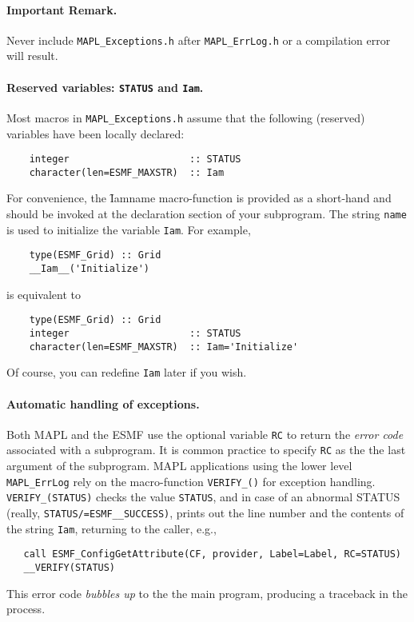 \paragraph{Important Remark.} Never include {\tt MAPL\_Exceptions.h}
after {\tt MAPL\_ErrLog.h} or a compilation error will result. 

\paragraph{Reserved variables: {\tt STATUS} and {\tt Iam}.} Most
macros in {\tt MAPL\_Exceptions.h} assume that the following
(reserved) variables have been locally declared:
\begin{verbatim}
    integer                     :: STATUS
    character(len=ESMF_MAXSTR)  :: Iam
\end{verbatim}
For convenience, the \f{Iam}{name} macro-function is provided as a
short-hand and should be invoked at the declaration section of your
subprogram. The string {\tt name} is used to initialize the variable
{\tt Iam}. For example,
\begin{verbatim}
    type(ESMF_Grid) :: Grid
    __Iam__('Initialize')
\end{verbatim}
is equivalent to
\begin{verbatim}
    type(ESMF_Grid) :: Grid
    integer                     :: STATUS
    character(len=ESMF_MAXSTR)  :: Iam='Initialize'
\end{verbatim}
Of course, you can redefine {\tt Iam} later if you wish.

\paragraph{Automatic handling of exceptions.}

Both MAPL and the ESMF use the optional variable {\tt RC} to return
the {\em error code} associated with a subprogram. It is common
practice to specify {\tt RC} as the the last argument of the subprogram. MAPL
applications using the lower level {\tt MAPL\_ErrLog} rely on the
macro-function {\tt VERIFY\_()} for exception handling. {\tt
  VERIFY\_(STATUS)} checks the value {\tt STATUS}, and in case of an
abnormal STATUS (really, {\tt STATUS/=ESMF\__SUCCESS)}, prints out the line
number and the contents of the string {\tt Iam}, returning to the caller, e.g.,
\begin{verbatim}
   call ESMF_ConfigGetAttribute(CF, provider, Label=Label, RC=STATUS)
   __VERIFY(STATUS)
\end{verbatim}
This error code {\em bubbles up} to the the main program, producing a
traceback in the process.

